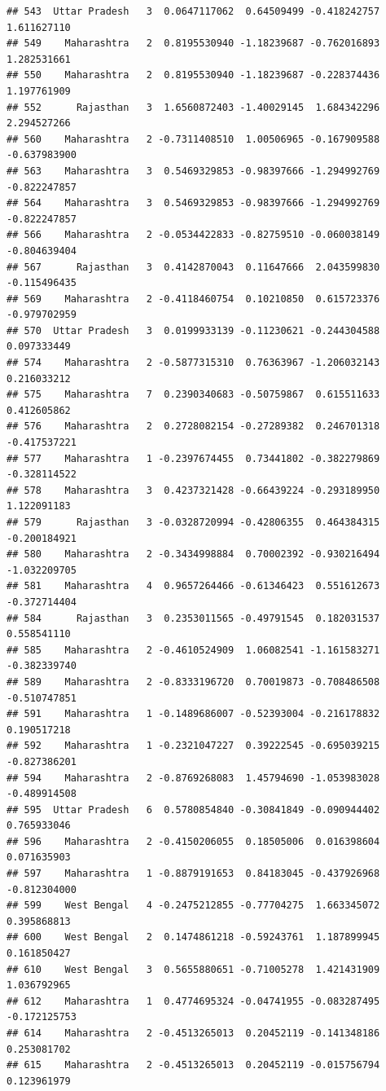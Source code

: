 \documentclass[
]{article}
\begin{document}
\begin{verbatim}
## 543  Uttar Pradesh   3  0.0647117062  0.64509499 -0.418242757  1.611627110
## 549    Maharashtra   2  0.8195530940 -1.18239687 -0.762016893  1.282531661
## 550    Maharashtra   2  0.8195530940 -1.18239687 -0.228374436  1.197761909
## 552      Rajasthan   3  1.6560872403 -1.40029145  1.684342296  2.294527266
## 560    Maharashtra   2 -0.7311408510  1.00506965 -0.167909588 -0.637983900
## 563    Maharashtra   3  0.5469329853 -0.98397666 -1.294992769 -0.822247857
## 564    Maharashtra   3  0.5469329853 -0.98397666 -1.294992769 -0.822247857
## 566    Maharashtra   2 -0.0534422833 -0.82759510 -0.060038149 -0.804639404
## 567      Rajasthan   3  0.4142870043  0.11647666  2.043599830 -0.115496435
## 569    Maharashtra   2 -0.4118460754  0.10210850  0.615723376 -0.979702959
## 570  Uttar Pradesh   3  0.0199933139 -0.11230621 -0.244304588  0.097333449
## 574    Maharashtra   2 -0.5877315310  0.76363967 -1.206032143  0.216033212
## 575    Maharashtra   7  0.2390340683 -0.50759867  0.615511633  0.412605862
## 576    Maharashtra   2  0.2728082154 -0.27289382  0.246701318 -0.417537221
## 577    Maharashtra   1 -0.2397674455  0.73441802 -0.382279869 -0.328114522
## 578    Maharashtra   3  0.4237321428 -0.66439224 -0.293189950  1.122091183
## 579      Rajasthan   3 -0.0328720994 -0.42806355  0.464384315 -0.200184921
## 580    Maharashtra   2 -0.3434998884  0.70002392 -0.930216494 -1.032209705
## 581    Maharashtra   4  0.9657264466 -0.61346423  0.551612673 -0.372714404
## 584      Rajasthan   3  0.2353011565 -0.49791545  0.182031537  0.558541110
## 585    Maharashtra   2 -0.4610524909  1.06082541 -1.161583271 -0.382339740
## 589    Maharashtra   2 -0.8333196720  0.70019873 -0.708486508 -0.510747851
## 591    Maharashtra   1 -0.1489686007 -0.52393004 -0.216178832  0.190517218
## 592    Maharashtra   1 -0.2321047227  0.39222545 -0.695039215 -0.827386201
## 594    Maharashtra   2 -0.8769268083  1.45794690 -1.053983028 -0.489914508
## 595  Uttar Pradesh   6  0.5780854840 -0.30841849 -0.090944402  0.765933046
## 596    Maharashtra   2 -0.4150206055  0.18505006  0.016398604  0.071635903
## 597    Maharashtra   1 -0.8879191653  0.84183045 -0.437926968 -0.812304000
## 599    West Bengal   4 -0.2475212855 -0.77704275  1.663345072  0.395868813
## 600    West Bengal   2  0.1474861218 -0.59243761  1.187899945  0.161850427
## 610    West Bengal   3  0.5655880651 -0.71005278  1.421431909  1.036792965
## 612    Maharashtra   1  0.4774695324 -0.04741955 -0.083287495 -0.172125753
## 614    Maharashtra   2 -0.4513265013  0.20452119 -0.141348186  0.253081702
## 615    Maharashtra   2 -0.4513265013  0.20452119 -0.015756794  0.123961979

\end{verbatim}
\end{document}
